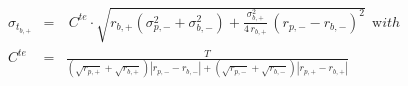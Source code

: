 


\begin{eqnarray*}
  \sigma_{t_{b,+}} & = & \ C^{te} \cdot \sqrt{r_{b,+}\left( \sigma_{p,-}^2 +
\sigma_{b,-}^2
          \right)  + \frac{\sigma_{b,+}^2} {4\,r_{b,+}}\,
          {\left( r_{p,-} - r_{b,-}\right) }^2} \ \ {\mathrm with}
\\
   C^{te} & = & \frac{T}
                 {\left( \sqrt{r_{p,+}} + \sqrt{r_{b,+}} \right)
                  \left| r_{p,-} - r_{b,-} \right| + 
                  \left( \sqrt{r_{p,-}} + \sqrt{r_{b,-}} \right)
                  \left| r_{p,+} - r_{b,+} \right|}
\end{eqnarray*}

